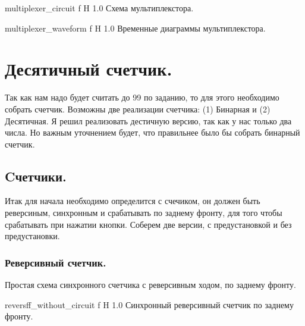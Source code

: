 \documentclass{bmstu}
\begin{document}
	{multiplexer_circuit}
	{f} %
	{H} %
	{1.0\textwidth} %
	{Схема мультиплекстора.} %
	
	{multiplexer_waveform}
	{f} %
	{H} %
	{1.0\textwidth} %
	{Временные диаграммы мультиплекстора.} %

	\chapter{Десятичный счетчик.}
	
	\begin{flushleft}
		Так как нам надо будет считать до 99 по заданию, то для этого необходимо собрать счетчик. 
		Возможны две реализации счетчика: (1) Бинарная и (2) Десятичная. Я решил реализовать дестичную версию,
		так как у нас только два числа. Но важным уточнением будет, что правильнее было бы собрать бинарный счетчик.
	\end{flushleft}

	\section{Cчетчики.}

	\begin{flushleft}
		Итак для начала необходимо определится с счечиком, он должен быть реверсиным,
		синхронным и срабатывать по заднему фронту, для того чтобы срабатывать при нажатии кнопки.
		Соберем две версии, с предустановкой и без предустановки.
	\end{flushleft}

	\subsection{Реверсивный счетчик.}

	\begin{flushleft}
		Простая схема синхронного счетчика с реверсивным ходом, по заднему фронту.
	\end{flushleft}

	{reversff_without_circuit}
	{f} %
	{H} %
	{1.0\textwidth} %
	{Синхронный реверсивный счетчик по заднему фронту.} %
	
\end{document}
